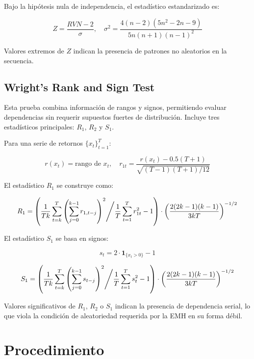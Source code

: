 \documentclass[12pt]{article}
\begin{document}
Bajo la hipótesis nula de independencia, el estadístico estandarizado es:

\[
Z = \frac{RVN - 2}{\sigma}, \quad \sigma^2 = \frac{4(n - 2)(5n^2 - 2n - 9)}{5n(n+1)(n - 1)^2}
\]

Valores extremos de $Z$ indican la presencia de patrones no aleatorios en la secuencia.

\subsection{Wright’s Rank and Sign Test}

Esta prueba combina información de rangos y signos, permitiendo evaluar dependencias sin requerir supuestos fuertes de distribución. Incluye tres estadísticos principales: $R_1$, $R_2$ y $S_1$.

Para una serie de retornos $\{x_t\}_{t=1}^T$:

\[
r(x_t) = \text{rango de } x_t, \quad r_{1t} = \frac{r(x_t) - 0.5(T + 1)}{\sqrt{(T - 1)(T + 1)/12}}
\]

El estadístico $R_1$ se construye como:

\[
R_1 = \left( \frac{1}{Tk} \sum_{t=k}^T \left( \sum_{j=0}^{k-1} r_{1,t-j} \right)^2 \middle/ \frac{1}{T} \sum_{t=1}^T r_{1t}^2 - 1 \right) \cdot \left( \frac{2(2k - 1)(k - 1)}{3kT} \right)^{-1/2}
\]

El estadístico $S_1$ se basa en signos:

\[
s_t = 2 \cdot \mathbf{1}_{\{x_t > 0\}} - 1
\]

\[
S_1 = \left( \frac{1}{Tk} \sum_{t=k}^T \left( \sum_{j=0}^{k-1} s_{t-j} \right)^2 \middle/ \frac{1}{T} \sum_{t=1}^T s_t^2 - 1 \right) \cdot \left( \frac{2(2k - 1)(k - 1)}{3kT} \right)^{-1/2}
\]

Valores significativos de $R_1$, $R_2$ o $S_1$ indican la presencia de dependencia serial, lo que viola la condición de aleatoriedad requerida por la EMH en su forma débil.

\section{Procedimiento}
\end{document}
